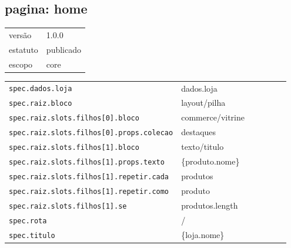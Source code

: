 \subsection*{pagina: home}
\begin{tabular}{@{}ll@{}}
versão & 1.0.0 \\
estatuto & publicado \\
escopo & core \\
\end{tabular}

\begin{tabular}{@{}p{0.35\linewidth}p{0.6\linewidth}@{}}
\texttt{spec.dados.loja} & dados.loja \\
\texttt{spec.raiz.bloco} & layout/pilha \\
\texttt{spec.raiz.slots.filhos[0].bloco} & commerce/vitrine \\
\texttt{spec.raiz.slots.filhos[0].props.colecao} & destaques \\
\texttt{spec.raiz.slots.filhos[1].bloco} & texto/titulo \\
\texttt{spec.raiz.slots.filhos[1].props.texto} & \{produto.nome\} \\
\texttt{spec.raiz.slots.filhos[1].repetir.cada} & produtos \\
\texttt{spec.raiz.slots.filhos[1].repetir.como} & produto \\
\texttt{spec.raiz.slots.filhos[1].se} & produtos.length \\
\texttt{spec.rota} & / \\
\texttt{spec.titulo} & \{loja.nome\} \\
\end{tabular}
